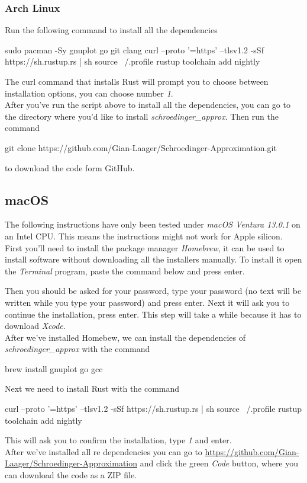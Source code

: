 \documentclass[11pt,DIV=10,final]{scrreprt} %
\begin{document}
\subsubsection{Arch Linux}
Run the following command to install all the dependencies
\begin{bashcode}
sudo pacman -Sy gnuplot go git clang
curl --proto '=https' --tlsv1.2 -sSf https://sh.rustup.rs | sh
source ~/.profile
rustup toolchain add nightly
\end{bashcode}
The curl command that installs Rust will prompt you to choose between installation options, you can choose number \emph{1}.
\\[3ex]
After you've run the script above to install all the dependencies, you can go to the directory where you'd like to install \emph{schroedinger\_approx}. Then run the command
\begin{bashcode}
git clone https://github.com/Gian-Laager/Schroedinger-Approximation.git
\end{bashcode}
to download the code form GitHub.

\subsection{macOS}
The following instructions have only been tested under \emph{macOS Ventura 13.0.1} on an Intel CPU. This means the instructions might not work for Apple silicon.
\\[3ex]
First you'll need to install the package manager \emph{Homebrew}, it can be used to install software without downloading all the installers manually. To install it open the \emph{Terminal} program, paste the command below and press enter.
Then you should be asked for your password, type your password (no text will be written while you type your password) and press enter.
Next it will ask you to continue the installation, press enter. This step will take a while because it has to download \emph{Xcode}.
\\[3ex]
After we've installed Homebew, we can install the dependencies of \emph{schroedinger\_approx} with the command
\begin{bashcode}
brew install gnuplot go gcc
\end{bashcode}
\vspace*{3ex}
Next we need to install Rust with the command
\begin{bashcode}
curl --proto '=https' --tlsv1.2 -sSf https://sh.rustup.rs | sh
source ~/.profile
rustup toolchain add nightly
\end{bashcode}
This will ask you to confirm the installation, type \emph{1} and enter.
\\[3ex]
After we've installed all re dependencies you can go to \url{https://github.com/Gian-Laager/Schroedinger-Approximation} and click the green \emph{Code} button,
where you can download the code as a ZIP file.
\end{document}
